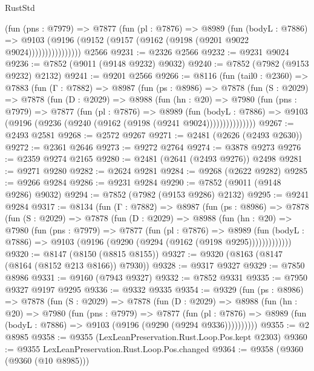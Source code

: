 \begin{lexlean}{RustStd}
\begin{coremodule}
                  (fun (pns : @7979) =>
                  @7877
                    (fun (pl : @7876) =>
                    @8989
                      (fun (bodyL : @7886) =>
                      @9103 (@9196 (@9152 (@9157 (@9162 (@9198 (@9201 @9022 @9024))))))))))))))))
    @2566
@9231 := @2326 @2566
@9232 := @9231 @9024
@9236 := @7852 (@9011 (@9148 @9232) @9032)
@9240 := @7852 (@7982 (@9153 @9232) @2132)
@9241 := @9201 @2566
@9266 := @8116
    (fun (tail0 : @2360) =>
    @7883
      (fun (Γ : @7882) =>
      @8987
        (fun (ps : @8986) =>
        @7878
          (fun (S : @2029) =>
          @7878
            (fun (D : @2029) =>
            @8988
              (fun (hn : @20) =>
              @7980
                (fun (pns : @7979) =>
                @7877
                  (fun (pl : @7876) =>
                  @8989
                    (fun (bodyL : @7886) =>
                    @9103 (@9196 (@9236 (@9240 (@9162 (@9198 (@9241 @9024)))))))))))))))
@9267 := @2493 @2581
@9268 := @2572 @9267
@9271 := @2481 (@2626 (@2493 @2630))
@9272 := @2361 @2646
@9273 := @9272 @2764
@9274 := @3878 @9273
@9276 := @2359 @9274 @2165
@9280 := @2481 (@2641 (@2493 @9276)) @2498
@9281 := @9271 @9280
@9282 := @2624 @9281
@9284 := @9268 (@2622 @9282)
@9285 := @9266 @9284
@9286 := @9231 @9284
@9290 := @7852 (@9011 (@9148 @9286) @9032)
@9294 := @7852 (@7982 (@9153 @9286) @2132)
@9295 := @9241 @9284
@9317 := @8134
    (fun (Γ : @7882) =>
    @8987
      (fun (ps : @8986) =>
      @7878
        (fun (S : @2029) =>
        @7878
          (fun (D : @2029) =>
          @8988
            (fun (hn : @20) =>
            @7980
              (fun (pns : @7979) =>
              @7877
                (fun (pl : @7876) =>
                @8989
                  (fun (bodyL : @7886) =>
                  @9103 (@9196 (@9290 (@9294 (@9162 (@9198 @9295)))))))))))))
@9320 := @8147 (@8150 (@8815 @8155))
@9327 := @9320 (@8163 (@8147 (@8164 (@8152 @213 @8166)) @7930))
@9328 := @9317 @9327
@9329 := @7850 @8986
@9331 := @9160 (@7943 @9327)
@9332 := @7852 @9331
@9335 := @7950 @9327 @9197 @9295
@9336 := @9332 @9335
@9354 := @9329
    (fun (ps : @8986) =>
    @7878
      (fun (S : @2029) =>
      @7878
        (fun (D : @2029) =>
        @8988
          (fun (hn : @20) =>
          @7980
            (fun (pns : @7979) =>
            @7877
              (fun (pl : @7876) =>
              @8989 (fun (bodyL : @7886) => @9103 (@9196 (@9290 (@9294 @9336))))))))))
@9355 := @2 @8985
@9358 := @9355 (LexLeanPreservation.Rust.Loop.Pos.kept @2303)
@9360 := @9355 LexLeanPreservation.Rust.Loop.Pos.changed
@9364 := @9358 (@9360 (@9360 (@10 @8985)))

\end{coremodule}
\end{lexlean}

